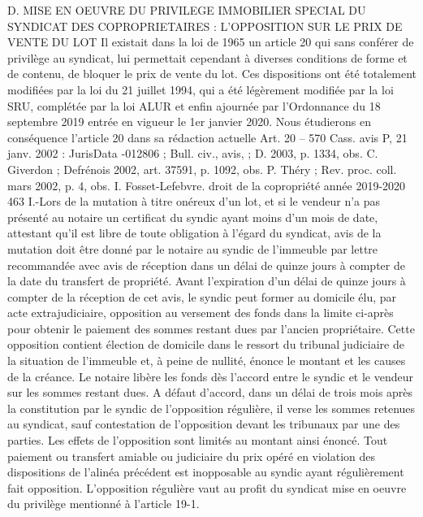 D. MISE EN OEUVRE DU PRIVILEGE IMMOBILIER SPECIAL DU SYNDICAT DES COPROPRIETAIRES : L’OPPOSITION SUR LE PRIX DE VENTE DU LOT
Il existait dans la loi de 1965 un article 20 qui sans conférer de privilège au syndicat, lui permettait cependant à diverses conditions de forme et de contenu, de bloquer le prix de vente du lot. Ces dispositions ont été totalement modifiées par la loi du 21 juillet 1994, qui a été légèrement modifiée par la loi SRU, complétée par la loi ALUR et enfin ajournée par l’Ordonnance du 18 septembre 2019 entrée en vigueur le 1er janvier 2020.
Nous étudierons en conséquence l'article 20 dans sa rédaction actuelle
Art. 20 –
570 Cass. avis  P, 21 janv. 2002 : JurisData -012806 ; Bull. civ., avis,  ; D. 2003, p. 1334, obs. C. Giverdon ; Defrénois 2002, art. 37591, p. 1092, obs. P. Théry ; Rev. proc. coll. mars 2002, p. 4, obs. I. Fosset-Lefebvre.
droit de la copropriété année 2019-2020
463
I.-Lors de la mutation à titre onéreux d'un lot, et si le vendeur n'a pas présenté au notaire un certificat du syndic ayant moins d'un mois de date, attestant qu'il est libre de toute obligation à l'égard du syndicat, avis de la mutation doit être donné par le notaire au syndic de l'immeuble par lettre recommandée avec avis de réception dans un délai de quinze jours à compter de la date du transfert de propriété. Avant l'expiration d'un délai de quinze jours à compter de la réception de cet avis, le syndic peut former au domicile élu, par acte extrajudiciaire, opposition au versement des fonds dans la limite ci-après pour obtenir le paiement des sommes restant dues par l'ancien propriétaire. Cette opposition contient élection de domicile dans le ressort du tribunal judiciaire de la situation de l'immeuble et, à peine de nullité, énonce le montant et les causes de la créance. Le notaire libère les fonds dès l'accord entre le syndic et le vendeur sur les sommes restant dues. A défaut d'accord, dans un délai de trois mois après la constitution par le syndic de l'opposition régulière, il verse les sommes retenues au syndicat, sauf contestation de l'opposition devant les tribunaux par une des parties. Les effets de l'opposition sont limités au montant ainsi énoncé.
Tout paiement ou transfert amiable ou judiciaire du prix opéré en violation des dispositions de l'alinéa précédent est inopposable au syndic ayant régulièrement fait opposition.
L'opposition régulière vaut au profit du syndicat mise en oeuvre du privilège mentionné à l'article 19-1.
